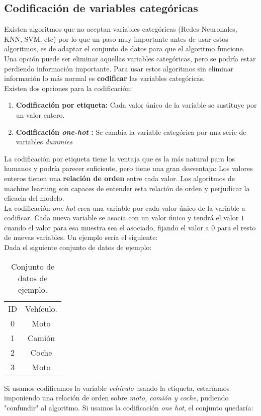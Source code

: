 \subsection{Codificación de variables categóricas}
Existen algoritmos que no aceptan variables categóricas (Redes Neuronales, KNN, SVM, etc) por lo que un paso muy importante antes de usar estos algoritmos, es de adaptar el conjunto de datos para que el algoritmo funcione. \\
Una opción puede ser eliminar aquellas variables categóricas, pero se podría estar perdiendo información importante. Para usar estos algoritmos sin eliminar información lo más normal es \textbf{codificar} las variables categóricas.\\
Existen dos opciones para la codificación:
\begin{enumerate}
	\item \textbf{Codificación por etiqueta:} Cada valor único de la variable se sustituye por un valor entero.
	      \item\textbf{Codificación \textit{one-hot }:} Se cambia la variable categórica por una serie de variables \textit{dummies}
\end{enumerate}

La codificación por etiqueta tiene la ventaja que es la más natural para los humanos y podría parecer suficiente, pero tiene una gran desventaja: Los valores enteros tienen una \textbf{relación de orden} entre cada valor. Los algoritmos de machine learning son capaces de entender esta relación de orden y perjudicar la eficacia del modelo.\\
\linebreak
La codificación \textit{one-hot}  crea una variable por cada valor único de la variable a codificar. Cada nueva variable se asocia con un valor único y tendrá el valor $1$ cuando el valor para esa muestra sea el asociado, fijando el valor a $0$ para el resto de nuevas variables. Un ejemplo sería el siguiente:\\
Dada el siguiente conjunto de datos de ejemplo:\\
\begin{table}[H]
	\centering
	\begin{tabular}{|c|c|}
		\cline{1-2}
		ID & Vehículo. \\ \cline{1-2}
		0  & Moto      \\ \cline{1-2}
		1  & Camión    \\ \cline{1-2}
		2  & Coche     \\ \cline{1-2}
		3  & Moto      \\ \cline{1-2}
	\end{tabular}
	\caption{Conjunto de datos de ejemplo.}
	\label{tab:conjunto_ejemplo}
\end{table}
Si usamos codificamos la variable \textit{vehículo} usando la etiqueta, estaríamos imponiendo una relación de orden sobre \textit{moto, camión y coche}, pudiendo "confundir" al algoritmo. Si usamos la codificación \textit{one hot}, el conjunto quedaría:


